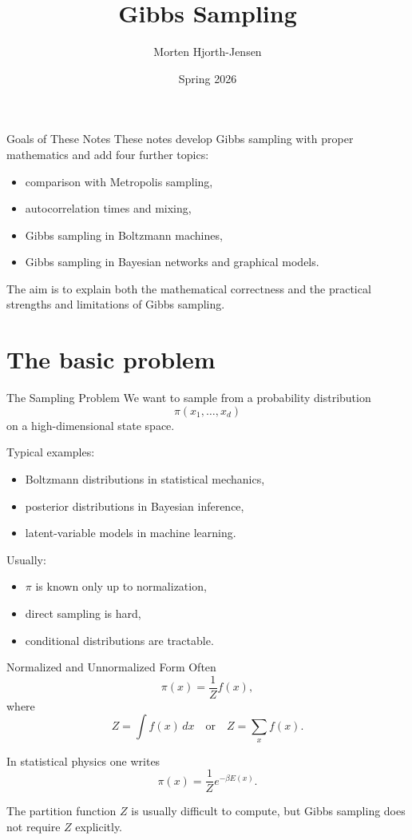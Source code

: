 \documentclass[aspectratio=169]{beamer}
\title{Gibbs Sampling}
\author{Morten Hjorth-Jensen}
\date{Spring 2026}
\begin{document}
\frame{\titlepage}

\begin{frame}{Goals of These Notes}
These notes develop Gibbs sampling with proper mathematics and add four further topics:
\begin{itemize}
    \item comparison with Metropolis sampling,
    \item autocorrelation times and mixing,
    \item Gibbs sampling in Boltzmann machines,
    \item Gibbs sampling in Bayesian networks and graphical models.
\end{itemize}

The aim is to explain both the mathematical correctness and the practical strengths and limitations of Gibbs sampling.
\end{frame}

\section{The basic problem}

\begin{frame}{The Sampling Problem}
We want to sample from a probability distribution
\[
\pi(x_1,\dots,x_d)
\]
on a high-dimensional state space.

Typical examples:
\begin{itemize}
    \item Boltzmann distributions in statistical mechanics,
    \item posterior distributions in Bayesian inference,
    \item latent-variable models in machine learning.
\end{itemize}

Usually:
\begin{itemize}
    \item \(\pi\) is known only up to normalization,
    \item direct sampling is hard,
    \item conditional distributions are tractable.
\end{itemize}
\end{frame}

\begin{frame}{Normalized and Unnormalized Form}
Often
\[
\pi(x)=\frac{1}{Z}f(x),
\]
where
\[
Z=\int f(x)\,dx
\quad\text{or}\quad
Z=\sum_x f(x).
\]

In statistical physics one writes
\[
\pi(x)=\frac{1}{Z}e^{-\beta E(x)}.
\]

The partition function \(Z\) is usually difficult to compute, but Gibbs sampling does not require \(Z\) explicitly.
\end{frame}
\end{document}
